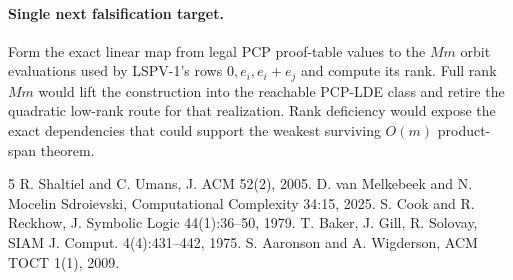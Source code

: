 \documentclass[11pt]{article}
\begin{document}
\paragraph{Single next falsification target.}
Form the exact linear map from legal PCP proof-table values to the $Mm$ orbit evaluations used by LSPV-1's rows $0,e_i,e_i+e_j$ and compute its rank. Full rank $Mm$ would lift the construction into the reachable PCP-LDE class and retire the quadratic low-rank route for that realization. Rank deficiency would expose the exact dependencies that could support the weakest surviving $O(m)$ product-span theorem.

\begin{thebibliography}{5}
 R. Shaltiel and C. Umans, J. ACM 52(2), 2005.
 D. van Melkebeek and N. Mocelin Sdroievski, Computational Complexity 34:15, 2025.
 S. Cook and R. Reckhow, J. Symbolic Logic 44(1):36--50, 1979.
 T. Baker, J. Gill, R. Solovay, SIAM J. Comput. 4(4):431--442, 1975.
 S. Aaronson and A. Wigderson, ACM TOCT 1(1), 2009.
\end{thebibliography}
\end{document}
